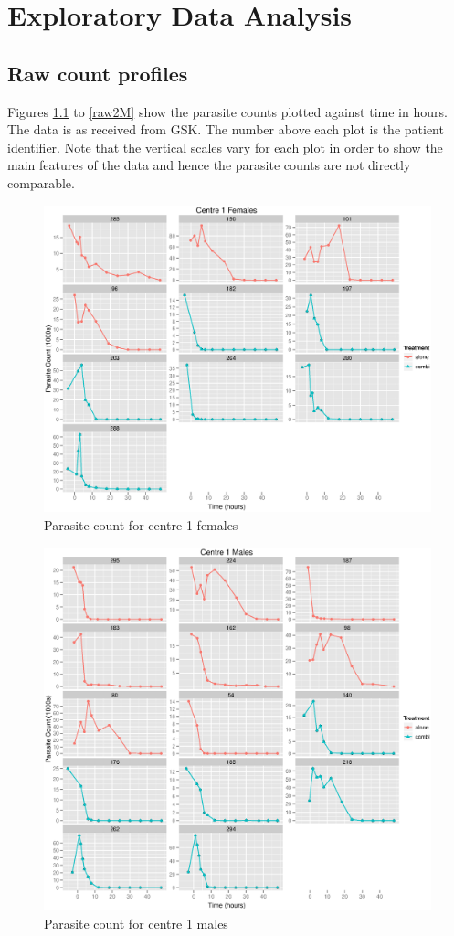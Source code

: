 \chapter{Exploratory Data Analysis}\label{data}

\section{Raw count profiles}
Figures \ref{raw1F} to \ref{raw2M} show the parasite counts plotted against time in hours. The data is as received from GSK. The number above each plot is the patient identifier. Note that the vertical scales vary for each plot in order to show the main features of the data and hence the parasite counts are not directly comparable.
\begin{figure}[h]
\centering
\includegraphics[width=150mm]{raw1f.eps}
\caption{Parasite count for centre 1 females}\label{raw1F}
\end{figure} 
\begin{figure}[h]
\centering
\includegraphics[width=150mm]{raw1m.eps}
\caption{Parasite count for centre 1 males}\label{raw1M}
\end{figure} 
